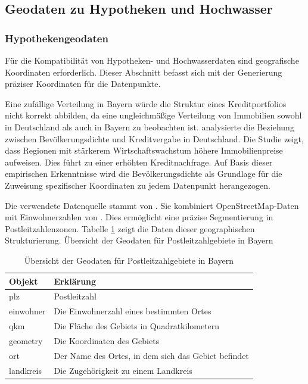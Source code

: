 \subsection{Geodaten zu Hypotheken und Hochwasser}
\subsubsection{Hypothekengeodaten}\label{sec:hypogeo}

Für die Kompatibilität von Hypotheken- und Hochwasserdaten sind geografische Koordinaten erforderlich. Dieser Abschnitt befasst sich mit der Generierung präziser Koordinaten für die Datenpunkte.

Eine zufällige Verteilung in Bayern würde die Struktur eines Kreditportfolios nicht korrekt abbilden, da eine ungleichmäßige Verteilung von Immobilien sowohl in Deutschland als auch in Bayern zu beobachten ist. \textcite{zurek2022real} analysierte die Beziehung zwischen Bevölkerungsdichte und Kreditvergabe in Deutschland. Die Studie zeigt, dass Regionen mit stärkerem Wirtschaftswachstum höhere Immobilienpreise aufweisen. Dies führt zu einer erhöhten Kreditnachfrage. Auf Basis dieser empirischen Erkenntnisse wird die Bevölkerungsdichte als Grundlage für die Zuweisung spezifischer Koordinaten zu jedem Datenpunkt herangezogen.

Die verwendete Datenquelle stammt von \textcite{suche_postleitzahl}. Sie kombiniert OpenStreetMap-Daten mit Einwohnerzahlen von \textcite{destatis}. Dies ermöglicht eine präzise Segmentierung in Postleitzahlenzonen. Tabelle \ref{tab:geodaten} zeigt die Daten dieser geographischen Strukturierung.
Übersicht der Geodaten für Postleitzahlgebiete in Bayern
\begin{table}[htbp]
    \centering
    \small
    \caption{Übersicht der Geodaten für Postleitzahlgebiete in Bayern}
    \label{tab:geodaten}
    \begin{tabularx}{1.0\textwidth}{>{\raggedright\arraybackslash}X >{\raggedright\arraybackslash}X}
        \toprule
        \textbf{Objekt} & \textbf{Erklärung} \\
        \midrule
        plz & Postleitzahl \\
        \addlinespace
        einwohner & Die Einwohnerzahl eines bestimmten Ortes \\
        \addlinespace
        qkm & Die Fläche des Gebiets in Quadratkilometern \\
        \addlinespace
        geometry & Die Koordinaten des Gebiets \\
        \addlinespace
        ort & Der Name des Ortes, in dem sich das Gebiet befindet \\
        \addlinespace
        landkreis & Die Zugehörigkeit zu einem Landkreis \\
        \bottomrule
    \end{tabularx}
\end{table}
\FloatBarrier


